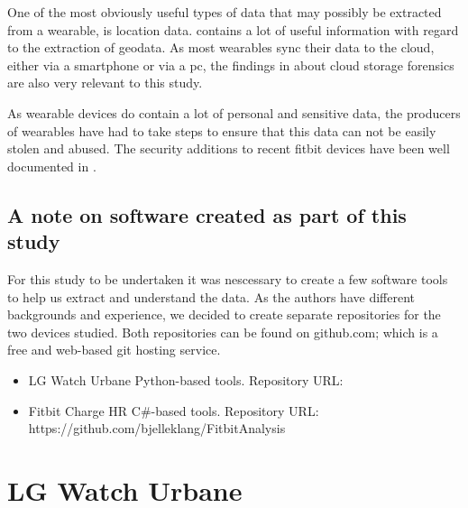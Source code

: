 \documentclass[a4paper,11pt,dvips]{article}
\begin{document}
One of the most obviously useful types of data that may possibly be extracted from a wearable, is location data. \cite{maus2011forensic} contains a lot of useful information with regard to the extraction of geodata. As most wearables sync their data to the cloud, either via a smartphone or via a pc, the findings in \cite{chung2012digital} about cloud storage forensics are also very relevant to this study.

As wearable devices do contain a lot of personal and sensitive data, the producers of wearables have had to take steps to ensure that this data can not be easily stolen and abused. The security additions to recent fitbit devices have been well documented in \cite{cyr2014security}.

\subsection{A note on software created as part of this study}
For this study to be undertaken it was nescessary to create a few software tools to help us extract and understand the data. As the authors have different backgrounds and experience, we decided to create separate repositories for the two devices studied. Both repositories can be found on github.com; which is a free and web-based git hosting service.

\begin{itemize}
	\item{LG Watch Urbane} Python-based tools. Repository URL:
	\item{Fitbit Charge HR} C\#-based tools. Repository URL:
	 \newline
	 https://github.com/bjelleklang/FitbitAnalysis
	
\end{itemize}
	
\section{LG Watch Urbane}
\end{document}
